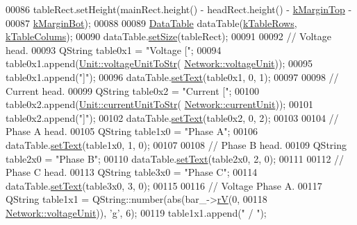 \begin{DoxyCode}
00086   tableRect.setHeight(mainRect.height() - headRect.height() - \hyperlink{class_info_bar_a810c3286fc4d960d04ffbd31318ebff2}{kMarginTop} -
00087                       \hyperlink{class_info_bar_a18194bb46d36b00aa9f0d01f24a87617}{kMarginBot});
00088 
00089   \hyperlink{class_data_table}{DataTable} dataTable(\hyperlink{class_info_bar_ad54d2dd19a63caf9d2476aace60ae3c5}{kTableRows}, \hyperlink{class_info_bar_a57e9e7c40a6fd2a56dd47a4512d65489}{kTableColums});
00090   dataTable.\hyperlink{class_data_table_a8a8cd6f95caaaff148993f8e28eeb703}{setSize}(tableRect);
00091 
00092   \textcolor{comment}{// Voltage head.}
00093   QString table0x1 = \textcolor{stringliteral}{"Voltage ["};
00094   table0x1.append(\hyperlink{class_unit_a7fa103c31f9f069961b35b6371ff0c0a}{Unit::voltageUnitToStr}(
      \hyperlink{group___models_gacde031ef95f5c05565ee35769f2ed89e}{Network::voltageUnit}));
00095   table0x1.append(\textcolor{stringliteral}{"]"});
00096   dataTable.\hyperlink{class_data_table_aee0d28c77116b51360f0124a529cb3ff}{setText}(table0x1, 0, 1);
00097 
00098   \textcolor{comment}{// Current head.}
00099   QString table0x2 = \textcolor{stringliteral}{"Current ["};
00100   table0x2.append(\hyperlink{class_unit_a7bd3ed3edcb18170cd162d384075b651}{Unit::currentUnitToStr}(
      \hyperlink{group___models_gac6a26db5fef2b1dd2a00faf6340d1702}{Network::currentUnit}));
00101   table0x2.append(\textcolor{stringliteral}{"]"});
00102   dataTable.\hyperlink{class_data_table_aee0d28c77116b51360f0124a529cb3ff}{setText}(table0x2, 0, 2);
00103 
00104   \textcolor{comment}{// Phase A head.}
00105   QString table1x0 = \textcolor{stringliteral}{"Phase A"};
00106   dataTable.\hyperlink{class_data_table_aee0d28c77116b51360f0124a529cb3ff}{setText}(table1x0, 1, 0);
00107 
00108   \textcolor{comment}{// Phase B head.}
00109   QString table2x0 = \textcolor{stringliteral}{"Phase B"};
00110   dataTable.\hyperlink{class_data_table_aee0d28c77116b51360f0124a529cb3ff}{setText}(table2x0, 2, 0);
00111 
00112   \textcolor{comment}{// Phase C head.}
00113   QString table3x0 = \textcolor{stringliteral}{"Phase C"};
00114   dataTable.\hyperlink{class_data_table_aee0d28c77116b51360f0124a529cb3ff}{setText}(table3x0, 3, 0);
00115 
00116   \textcolor{comment}{// Voltage Phase A.}
00117   QString table1x1 = QString::number(abs(bar\_->\hyperlink{group___models_ga6c83eb997f5038e0b9bbd5472582e0a8}{rV}(0,
00118                                          \hyperlink{group___models_gacde031ef95f5c05565ee35769f2ed89e}{Network::voltageUnit})), \textcolor{charliteral}{'g'}, 6);
00119   table1x1.append(\textcolor{stringliteral}{" / "});

\end{DoxyCode}
